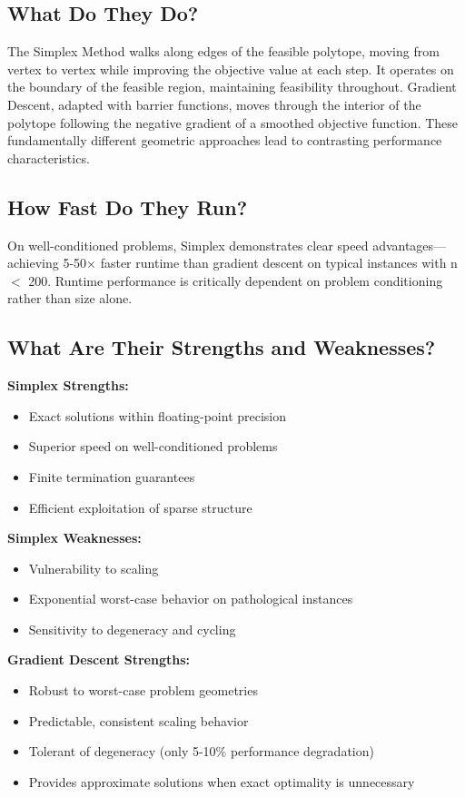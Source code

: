 \documentclass[11pt]{article}
\begin{document}
\subsection{What Do They Do?}
The Simplex Method walks along edges of the feasible polytope, moving from vertex to vertex while improving the objective value at each step. It operates on the boundary of the feasible region, maintaining feasibility throughout. Gradient Descent, adapted with barrier functions, moves through the interior of the polytope following the negative gradient of a smoothed objective function. These fundamentally different geometric approaches lead to contrasting performance characteristics.

\subsection{How Fast Do They Run?}
On well-conditioned problems, Simplex demonstrates clear speed advantages—achieving 5-50× faster runtime than gradient descent on typical instances with n \(<\) 200. Runtime performance is critically dependent on problem conditioning rather than size alone.

\subsection{What Are Their Strengths and Weaknesses?}
\textbf{Simplex Strengths:}
\begin{itemize}
    \item Exact solutions within floating-point precision
    \item Superior speed on well-conditioned problems
    \item Finite termination guarantees
    \item Efficient exploitation of sparse structure
\end{itemize}

\textbf{Simplex Weaknesses:}
\begin{itemize}
    \item Vulnerability to scaling
    \item Exponential worst-case behavior on pathological instances
    \item Sensitivity to degeneracy and cycling
\end{itemize}

\textbf{Gradient Descent Strengths:}
\begin{itemize}
    \item Robust to worst-case problem geometries
    \item Predictable, consistent scaling behavior
    \item Tolerant of degeneracy (only 5-10\% performance degradation)
    \item Provides approximate solutions when exact optimality is unnecessary
\end{itemize}
\end{document}
